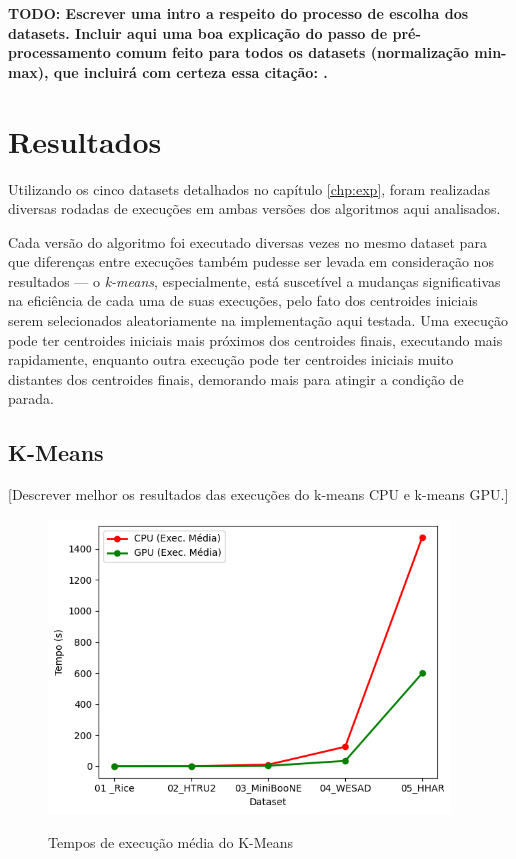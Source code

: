 \documentclass[12pt,
openright, 
oneside, %
a4paper,    %
brazil]{facom-ufu-abntex2}
\begin{document}
\textbf{TODO: Escrever uma intro a respeito do processo de escolha dos datasets. Incluir aqui uma boa explicação do passo de pré-processamento comum feito para todos os datasets (normalização min-max), que incluirá com certeza essa citação: \cite{standardizOfVars1988}.}






\chapter{Resultados}

Utilizando os cinco datasets detalhados no capítulo \ref{chp:exp}, foram realizadas diversas rodadas de execuções em ambas versões dos algoritmos aqui analisados.

Cada versão do algoritmo foi executado diversas vezes no mesmo dataset para que diferenças entre execuções também pudesse ser levada em consideração nos resultados — o \textit{k-means}, especialmente, está suscetível a mudanças significativas na eficiência de cada uma de suas execuções, pelo fato dos centroides iniciais serem selecionados aleatoriamente na implementação aqui testada. Uma execução pode ter centroides iniciais mais próximos dos centroides finais, executando mais rapidamente, enquanto outra execução pode ter centroides iniciais muito distantes dos centroides finais, demorando mais para atingir a condição de parada.




\section{K-Means}

[Descrever melhor os resultados das execuções do k-means CPU e k-means GPU.]

\begin{figure}[h]
  \caption{Tempos de execução média do K-Means}
  \centering
  \includegraphics[width=0.95\textwidth]{kMeansResultsAvg.png}
  \label{fig:kMeansAvg}
\end{figure}
\end{document}
